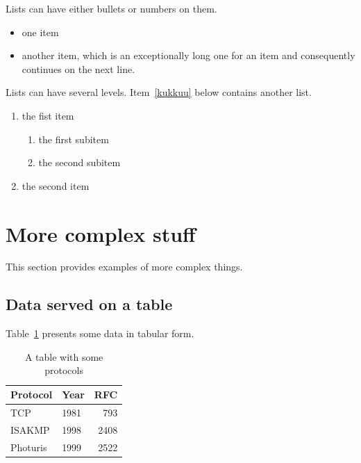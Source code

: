 \documentclass[article]{aaltoseries}
\begin{document}
Lists can have either bullets or numbers on them. 

\begin{itemize}
\item one item
\item another item, which is an exceptionally long one for an item
  and consequently continues on the next line.
\end{itemize}

Lists can have several levels. Item~\ref{kukkuu} below contains
another list.
\begin{enumerate}
\item the fist item \label{kukkuu}
  \begin{enumerate}
  \item the first subitem 
  \item the second subitem
  \end{enumerate}
\item the second item
\end{enumerate}




\section{More complex stuff}

This section provides examples of more complex things.




\subsection{Data served on a table}


Table~\ref{tab:mytable1} presents some data in tabular form. 

\begin{table}[t!]
  \begin{center}
    \begin{tabular}{|l|lr|}
    \hline
    Protocol & Year &  RFC \\
    \hline
    TCP      & 1981 &  793 \\
    ISAKMP   & 1998 & 2408 \\
    Photuris & 1999 & 2522 \\
    \hline
    \end{tabular}
    \caption{A table with some protocols}
    \label{tab:mytable1}
  \end{center}
\end{table}
\end{document}
